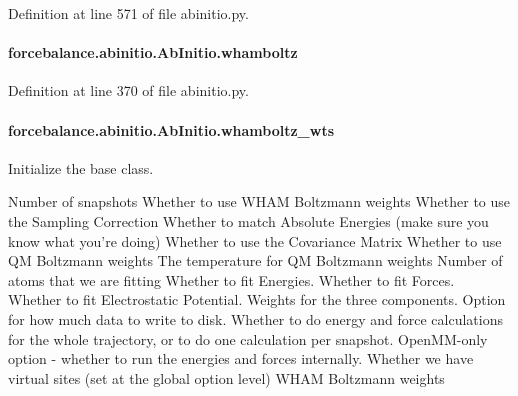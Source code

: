 Definition at line 571 of file abinitio.\-py.

\hypertarget{classforcebalance_1_1abinitio_1_1AbInitio_a8f70f017ca8ec54c1acdbc85eff06ab9}{
\paragraph[{whamboltz}]{\setlength{\rightskip}{0pt plus 5cm}forcebalance.\-abinitio.\-Ab\-Initio.\-whamboltz\hspace{0.3cm}{\ttfamily [inherited]}}}\label{classforcebalance_1_1abinitio_1_1AbInitio_a8f70f017ca8ec54c1acdbc85eff06ab9}


Definition at line 370 of file abinitio.\-py.

\hypertarget{classforcebalance_1_1abinitio_1_1AbInitio_a885e7ef58b9e7c6abbc24321e5f3c61a}{
\paragraph[{whamboltz\-\_\-wts}]{\setlength{\rightskip}{0pt plus 5cm}forcebalance.\-abinitio.\-Ab\-Initio.\-whamboltz\-\_\-wts\hspace{0.3cm}{\ttfamily [inherited]}}}\label{classforcebalance_1_1abinitio_1_1AbInitio_a885e7ef58b9e7c6abbc24321e5f3c61a}


Initialize the base class. 

Number of snapshots Whether to use W\-H\-A\-M Boltzmann weights Whether to use the Sampling Correction Whether to match Absolute Energies (make sure you know what you're doing) Whether to use the Covariance Matrix Whether to use Q\-M Boltzmann weights The temperature for Q\-M Boltzmann weights Number of atoms that we are fitting Whether to fit Energies. Whether to fit Forces. Whether to fit Electrostatic Potential. Weights for the three components. Option for how much data to write to disk. Whether to do energy and force calculations for the whole trajectory, or to do one calculation per snapshot. Open\-M\-M-\/only option -\/ whether to run the energies and forces internally. Whether we have virtual sites (set at the global option level) W\-H\-A\-M Boltzmann weights 

